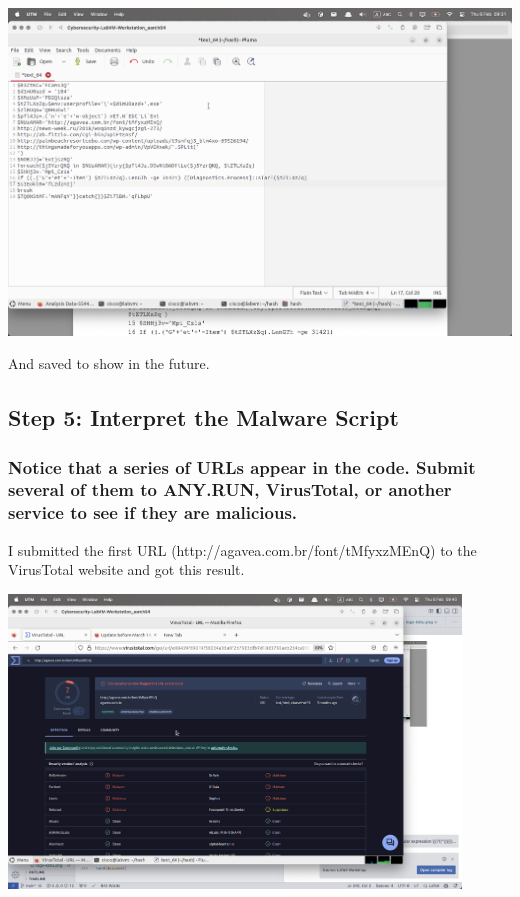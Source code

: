 \documentclass{article}
\begin{document}
\vspace{1\baselineskip}

\includegraphics[width=1\textwidth]{14.png}

\vspace{1\baselineskip}

And saved to show in the future.

\vspace{1\baselineskip}

\newpage

\subsection*{Step 5: Interpret the Malware Script}

\subsubsection*{Notice that a series of URLs appear in the code. Submit several of them to ANY.RUN, VirusTotal, or
another service to see if they are malicious.}

I submitted the first URL (http://agavea.com.br/font/tMfyxzMEnQ) to the VirusTotal website and got this result.

\includegraphics[width=0.9\textwidth]{15.png}
\end{document}
